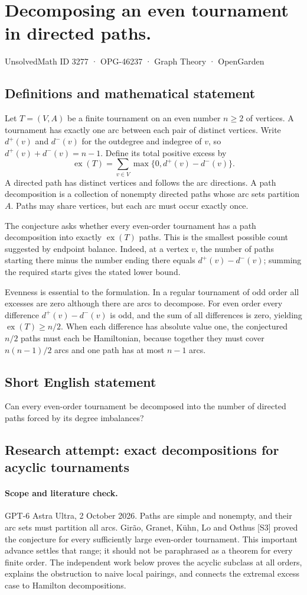 \documentclass[11pt,a4paper]{article}
\begin{document}
\section*{Decomposing an even tournament in directed paths.}\label{3277}
{\small UnsolvedMath ID 3277 · OPG-46237 · Graph Theory · OpenGarden}
\subsection{Definitions and mathematical statement}
Let $T=(V,A)$ be a finite tournament on an even number $n\ge2$ of
vertices. A tournament has exactly one arc between each pair of
distinct vertices. Write $d^+(v)$ and $d^-(v)$ for the outdegree and
indegree of $v$, so $d^+(v)+d^-(v)=n-1$. Define its total positive excess
by
\[
 \operatorname{ex}(T)=\sum_{v\in V}\max\{0,d^+(v)-d^-(v)\}.
\]
A directed path has distinct vertices and follows the arc directions.
A path decomposition is a collection of nonempty directed paths whose
arc sets partition $A$. Paths may share vertices, but each arc must
occur exactly once.

The conjecture asks whether every even-order tournament has a path
decomposition into exactly $\operatorname{ex}(T)$ paths. This is the
smallest possible count suggested by endpoint balance. Indeed, at a
vertex $v$, the number of paths starting there minus the number ending
there equals $d^+(v)-d^-(v)$; summing the required starts gives the stated
lower bound.

Evenness is essential to the formulation. In a regular tournament of
odd order all excesses are zero although there are arcs to decompose.
For even order every difference $d^+(v)-d^-(v)$ is odd, and the sum of
all differences is zero, yielding $\operatorname{ex}(T)\ge n/2$.
When each difference has absolute value one, the conjectured $n/2$
paths must each be Hamiltonian, because together they must cover
$n(n-1)/2$ arcs and one path has at most $n-1$ arcs.
\subsection{Short English statement}
Can every even-order tournament be decomposed into the number of directed paths forced by its degree imbalances?
\subsection{Research attempt: exact decompositions for acyclic tournaments}
\paragraph{Scope and literature check.}
GPT-6 Astra Ultra, 2 October 2026. Paths are simple and nonempty,
and their arc sets must partition all arcs. Gir\~ao, Granet,
K\"uhn, Lo and Osthus [S3] proved the conjecture for every sufficiently
large even-order tournament. This important advance settles that
range; it should not be paraphrased as a theorem for every finite
order. The independent work below proves the acyclic subclass at
all orders, explains the obstruction to naive local pairings, and
connects the extremal excess case to Hamilton decompositions.
\end{document}

